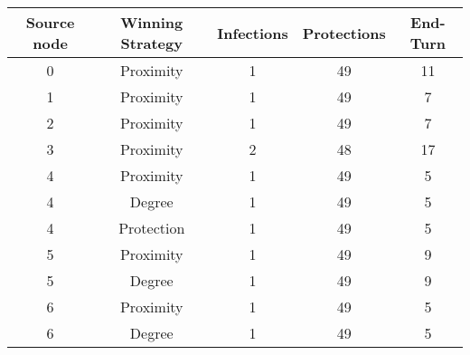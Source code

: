 \documentclass[results.tex]{subfiles}
\begin{document}
    \begin{center}
        \begin{tabular}{| c || c | c | c | c |}
            \hline
            {\bfseries Source node} & {\bfseries Winning Strategy} & {\bfseries Infections} & {\bfseries Protections}
            & {\bfseries End-Turn}
            \\  %
            \hline\hline
            0                       & Proximity                    & 1                      & 49                      & 11                   \\
            \hline
            1                       & Proximity                    & 1                      & 49                      & 7                    \\
            \hline
            2                       & Proximity                    & 1                      & 49                      & 7                    \\
            \hline
            3                       & Proximity                    & 2                      & 48                      & 17                   \\
            \hline
            4                       & Proximity                    & 1                      & 49                      & 5                    \\
            \hline
            4                       & Degree                       & 1                      & 49                      & 5                    \\
            \hline
            4                       & Protection                   & 1                      & 49                      & 5                    \\
            \hline
            5                       & Proximity                    & 1                      & 49                      & 9                    \\
            \hline
            5                       & Degree                       & 1                      & 49                      & 9                    \\
            \hline
            6                       & Proximity                    & 1                      & 49                      & 5                    \\
            \hline
            6                       & Degree                       & 1                      & 49                      & 5                    \\

\end{tabular}
\end{center}
\end{document}
